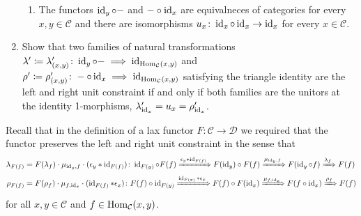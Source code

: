 \begin{Exercise}
\begin{enumerate}[resume, label=(\alph*)]
\begin{enumerate}[label=(\arabic*)]
			\item 
			The functors $ \operatorname{id}_y \circ - $ and $ - \circ \operatorname{id}_x $ are equivalneces of categories for every $ x , y \in \mathcal{ C } $ and there are isomorphisms $ u_x \colon \operatorname{id}_x \circ \operatorname{id}_x \to \operatorname{id}_x $ for every $ x \in \mathcal{ C } $.
		\end{enumerate}
		
		\item 
		Show that two families of natural transformations $ \lambda' \coloneqq \lambda'_{ ( x , y ) } \colon \operatorname{id}_y \circ - \implies \operatorname{id}_{ \operatorname{Hom}_{ \mathcal{ C } } ( x , y ) }$ and $ \rho' \coloneqq \rho'_{ ( x , y ) } \colon - \circ \operatorname{id}_x \implies \operatorname{id}_{ \operatorname{Hom}_{ \mathcal{ C } } ( x , y )  } $ satisfying the triangle identity are the left and right unit constraint if and only if both families are the unitors at the identity 1-morphisms, $ \lambda_{ \operatorname{id}_x }' = u_x = \rho'_{ \operatorname{id}_x }$.
	\end{enumerate}
	
	Recall that in the definition of a lax functor $ F \colon \mathcal{ C } \to \mathcal{ D } $ we required that the functor preserves the left and right unit constraint in the sense that 
	\begin{align*}
		\lambda_{ F ( f ) } 
		&=
		F ( \lambda_f ) \cdot \mu_{ \operatorname{id}_y , f } \cdot ( \epsilon_y * \operatorname{id}_{ F ( f ) } ) \colon \operatorname{id}_{ F ( y ) } \circ F ( f ) 
		\xRightarrow{ \epsilon_y * \operatorname{id}_{ F ( f ) } } 
		F ( \operatorname{id}_y ) \circ F ( f ) 
		\xRightarrow{ \mu_{ \operatorname{id}_y , f } }
		F ( \operatorname{id}_y \circ f ) 
		\xRightarrow{ \lambda_f }
		F ( f ) 
		\\
		\rho_{ F ( f ) } 
		&=
		F ( \rho_f ) \cdot \mu_{ f , \operatorname{id}_x } \cdot ( \operatorname{id}_{ F ( f ) } * \epsilon_x ) \colon F ( f ) \circ \operatorname{id}_{ F ( y ) }
		\xRightarrow{ \operatorname{id}_{ F ( x ) } * \epsilon_x } 
		F ( f ) \circ F ( \operatorname{id}_x ) 
		\xRightarrow{ \mu_{ f , \operatorname{id}_x } }
		F ( f \circ \operatorname{id}_x ) 
		\xRightarrow{ \rho_f }
		F ( f )
	\end{align*}
	for all $ x ,y \in \mathcal{ C } $ and $ f \in \operatorname{Hom}_{ \mathcal{ C } } ( x , y ) $.
	

\end{Exercise}

